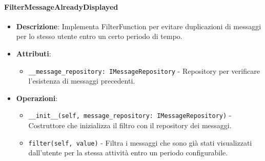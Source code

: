 \documentclass[10pt]{article}
\begin{document}
    \paragraph{FilterMessageAlreadyDisplayed}
    \begin{itemize}
        \item \textbf{Descrizione}: Implementa FilterFunction per evitare duplicazioni di messaggi per lo stesso utente entro un certo periodo di tempo.
        \item \textbf{Attributi}:
        \begin{itemize}
            \item \texttt{\_\_message\_repository: IMessageRepository} - Repository per verificare l'esistenza di messaggi precedenti.
        \end{itemize}
        \item \textbf{Operazioni}:
        \begin{itemize}
            \item \texttt{\_\_init\_\_(self, message\_repository: IMessageRepository)} - Costruttore che inizializza il filtro con il repository dei messaggi.
            \item \texttt{filter(self, value)} - Filtra i messaggi che sono già stati visualizzati dall'utente per la stessa attività entro un periodo configurabile.
        \end{itemize}
    \end{itemize}
\end{document}
